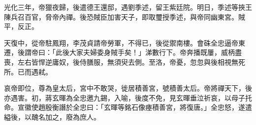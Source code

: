 \begin{pinyinscope}
 光化三年，帝獵夜歸，後遣德王還邸，遇劉季述，留王紫廷院。明日，季述等挾王陳兵召百官，脅帝內禪。後恐賊臣加害天子，即取璽授季述，與帝同幽東宮。賊平，反正。



 天復中，從帝駐鳳翔，李茂貞請帝勞軍，不得已，後從禦南樓。會硃全忠逼帝東遷，後謂帝曰：「此後大家夫婦委身賊手矣！」涕數行下。帝奔播既屢，威柄盡喪，左右皆悍逆庸奴，後侍膳服，無須臾去側。至洛，帝憂，忽忽與後相視無死所。已而遇弒。



 哀帝即位，尊為皇太后，宮中不敢哭，徙居積善宮，號積善太后。帝將禪天下，後亦遇害。初，蔣玄暉為全忠邀九錫，入喻，後度不免，見玄暉垂泣祈哀，以母子托命。宣徽使趙殷衡譖於全忠曰：「玄暉等銘石像瘞積善宮，將復唐。」全忠怒，遂遣縊後，以醜名加之，廢為庶人。



\end{pinyinscope}